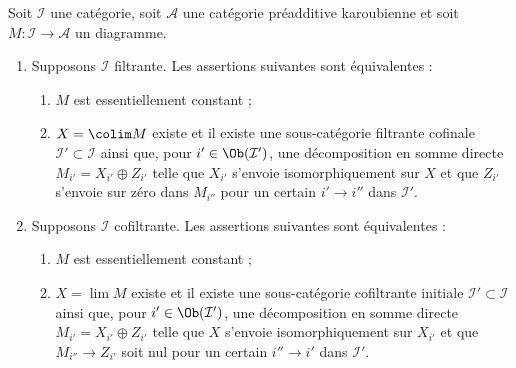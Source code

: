\begin{lemma}
\label{lemma-essentially-constant-into-karoubian}
Soit $\mathcal{I}$ une catégorie, soit $\mathcal{A}$ une catégorie
préadditive karoubienne et soit $M : \mathcal{I} \to \mathcal{A}$ un diagramme.
\begin{enumerate}
\item Supposons $\mathcal{I}$ filtrante. Les assertions suivantes sont
équivalentes :
\begin{enumerate}
\item $M$ est essentiellement constant ;
\item $X = \colim M$ existe et il existe une sous-catégorie filtrante cofinale
$\mathcal{I}' \subset \mathcal{I}$ ainsi que, pour
$i' \in \Ob(\mathcal{I}')$, une décomposition en somme directe
$M_{i'} = X_{i'} \oplus Z_{i'}$ telle que $X_{i'}$ s'envoie
isomorphiquement sur $X$ et que $Z_{i'}$ s'envoie sur zéro dans $M_{i''}$
pour un certain $i' \to i''$ dans $\mathcal{I}'$.
\end{enumerate}
\item Supposons $\mathcal{I}$ cofiltrante. Les assertions suivantes sont
équivalentes :
\begin{enumerate}
\item $M$ est essentiellement constant ;
\item $X = \lim M$ existe et il existe une sous-catégorie cofiltrante initiale
$\mathcal{I}' \subset \mathcal{I}$ ainsi que, pour
$i' \in \Ob(\mathcal{I}')$, une décomposition en somme directe
$M_{i'} = X_{i'} \oplus Z_{i'}$
telle que $X$ s'envoie isomorphiquement sur $X_{i'}$ et que
$M_{i''} \to Z_{i'}$ soit nul pour un certain $i'' \to i'$ dans
$\mathcal{I}'$.
\end{enumerate}
\end{enumerate}
\end{lemma}

